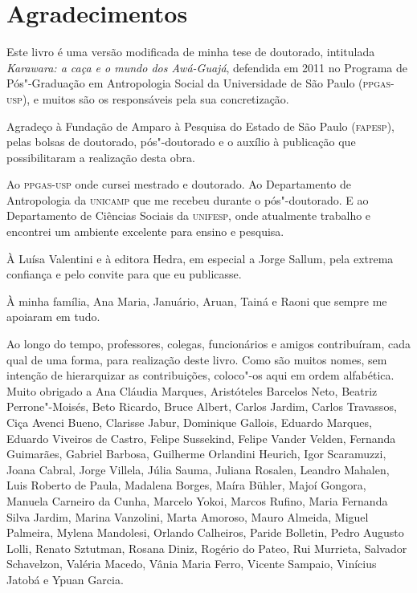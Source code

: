 \chapter*{Agradecimentos}

\noindent Este livro é uma versão modificada de minha tese de doutorado,
intitulada \emph{Karawara: a caça e o mundo dos Awá-Guajá}, defendida em
2011 no Programa de Pós"-Graduação em Antropologia Social da Universidade
de São Paulo (\textsc{ppgas-usp}), e muitos são os responsáveis pela sua
concretização.

Agradeço à Fundação de Amparo à Pesquisa do Estado de São Paulo
(\textsc{fapesp}), pelas bolsas de doutorado, pós"-doutorado e o auxílio à
publicação que possibilitaram a realização desta obra.

Ao \textsc{ppgas-usp} onde cursei mestrado e doutorado. Ao Departamento de
Antropologia da \textsc{unicamp} que me recebeu durante o pós"-doutorado. E ao
Departamento de Ciências Sociais da \textsc{unifesp}, onde atualmente trabalho e
encontrei um ambiente excelente para ensino e pesquisa.

À Luísa Valentini e à editora Hedra, em especial a Jorge Sallum, pela
extrema confiança e pelo convite para que eu publicasse.

À minha família, Ana Maria, Januário, Aruan, Tainá e Raoni que sempre me
apoiaram em tudo.

Ao longo do tempo, professores, colegas, funcionários e amigos
contribuíram, cada qual de uma forma, para realização deste livro. Como
são muitos nomes, sem intenção de hierarquizar as contribuições,
coloco"-os aqui em ordem alfabética. Muito obrigado a Ana Cláudia
Marques, Aristóteles Barcelos Neto, Beatriz Perrone"-Moisés, Beto
Ricardo, Bruce Albert, Carlos Jardim, Carlos Travassos, Ciça Avenci
Bueno, Clarisse Jabur, Dominique Gallois, Eduardo Marques, Eduardo Viveiros de Castro,
Felipe Sussekind, Felipe Vander Velden, Fernanda Guimarães, Gabriel Barbosa, Guilherme
Orlandini Heurich, Igor Scaramuzzi, Joana Cabral, Jorge Villela, Júlia
Sauma, Juliana Rosalen, Leandro Mahalen, Luis Roberto de Paula, Madalena
Borges, Maíra Bühler, Majoí Gongora, Manuela Carneiro da Cunha, Marcelo
Yokoi, Marcos Rufino, Maria Fernanda Silva Jardim, Marina Vanzolini,
Marta Amoroso, Mauro Almeida, Miguel Palmeira, Mylena Mandolesi, Orlando Calheiros, Paride
Bolletin, Pedro Augusto Lolli, Renato Sztutman, Rosana Diniz, Rogério do
Pateo, Rui Murrieta, Salvador Schavelzon, Valéria Macedo, Vânia Maria Ferro, Vicente
Sampaio, Vinícius Jatobá e Ypuan Garcia.


